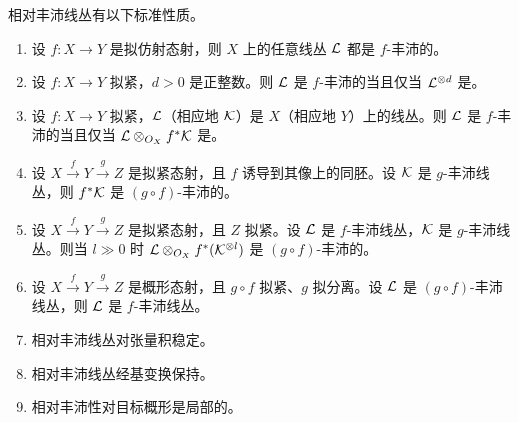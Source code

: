 \begin{lemma}\label{lem:28.4.4}
相对丰沛线丛有以下标准性质。
\begin{enumerate}[label=(\arabic*),leftmargin=2.6em,itemsep=0.35ex]
  \item 设 $f\colon X\to Y$ 是拟仿射态射，则 $X$ 上的任意线丛 $\mathcal{L}$ 都是 $f$-丰沛的。
  \item 设 $f\colon X\to Y$ 拟紧，$d>0$ 是正整数。则 $\mathcal{L}$ 是 $f$-丰沛的当且仅当 $\mathcal{L}^{\otimes d}$ 是。
  \item 设 $f\colon X\to Y$ 拟紧，$\mathcal{L}$（相应地 $\mathcal{K}$）是 $X$（相应地 $Y$）上的线丛。则 $\mathcal{L}$ 是 $f$-丰沛的当且仅当 $\mathcal{L}\otimes_{O_X}f^*\mathcal{K}$ 是。
  \item 设 $X\xrightarrow{f}Y\xrightarrow{g}Z$ 是拟紧态射，且 $f$ 诱导到其像上的同胚。设 $\mathcal{K}$ 是 $g$-丰沛线丛，则 $f^*\mathcal{K}$ 是 $(g\circ f)$-丰沛的。
  \item[\textup{(4')}] 设 $X\xrightarrow{f}Y\xrightarrow{g}Z$ 是拟紧态射，且 $Z$ 拟紧。设 $\mathcal{L}$ 是 $f$-丰沛线丛，$\mathcal{K}$ 是 $g$-丰沛线丛。则当 $l\gg 0$ 时 $\mathcal{L}\otimes_{O_X}f^*(\mathcal{K}^{\otimes l})$ 是 $(g\circ f)$-丰沛的。
  \item 设 $X\xrightarrow{f}Y\xrightarrow{g}Z$ 是概形态射，且 $g\circ f$ 拟紧、$g$ 拟分离。设 $\mathcal{L}$ 是 $(g\circ f)$-丰沛线丛，则 $\mathcal{L}$ 是 $f$-丰沛线丛。
  \item 相对丰沛线丛对张量积稳定。
  \item 相对丰沛线丛经基变换保持。
  \item 相对丰沛性对目标概形是局部的。
\end{enumerate}
\end{lemma}

